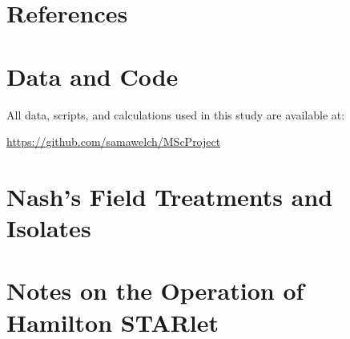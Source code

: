 \documentclass[final,1p,times]{elsarticle}
\begin{document}
\section{References}
\label{S:7}


\begin{appendices}

\section{Data and Code}
\label{A:1}

All data, scripts, and calculations used in this study are available at: 

\url{https://github.com/samawelch/MScProject}

\section{Nash's Field Treatments and Isolates}
\label{A:2}


\section{Notes on the Operation of Hamilton STARlet}
\label{A:3}
\end{appendices}
\end{document}
